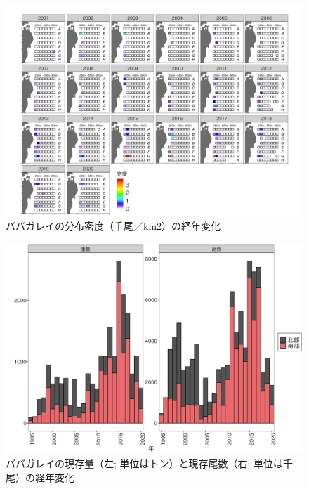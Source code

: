 \documentclass[11pt]{article} %
\begin{document}
\begin{linenumbers}
\begin{figure}[h]
  \centering
  \includegraphics[width = 14cm]{ババガレイdens.png}
  \caption{ババガレイの分布密度（千尾／km2）の経年変化}
\end{figure}

\begin{figure}[h]
  \centering
  \includegraphics[width = 14cm]{ババガレイtrend.png}
  \caption{ババガレイの現存量（左; 単位はトン）と現存尾数（右; 単位は千尾）の経年変化}
\end{figure}


\end{linenumbers}
\end{document}
